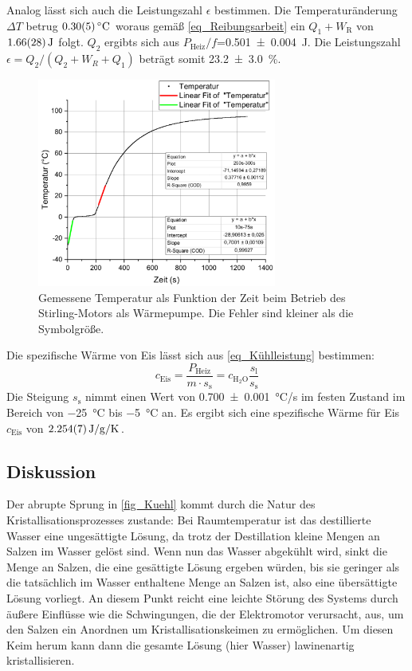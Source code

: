 \documentclass[
	a4paper,
	12pt,
	pagesize,
	ngerman
]{scrartcl}
\begin{document}
	Analog lässt sich auch die Leistungszahl $\epsilon$ bestimmen. 
	Die Temperaturänderung $\Delta{T}$ betrug $\SI{0,3+-0,05}{\degreeCelsius}$ woraus gemäß \cref{eq_Reibungsarbeit} ein $Q_1+W_\text{R}$ von $\SI{1,66+-0,28}{J}$ folgt. 
	$Q_2$ ergibts sich aus $P_\text{Heiz}/f$=\SI{0,501+-0,004}{J}.
	Die Leistungszahl $\epsilon=Q_2/(Q_2+W_R+Q_1)$ beträgt somit \SI{23,2+-3,0}{\%}.
	\begin{figure}[H]
		\includegraphics[width=0.7\textwidth]{Waerm}
		\centering
		\caption{Gemessene Temperatur als Funktion der Zeit beim Betrieb des Stirling-Motors als Wärmepumpe. Die Fehler sind kleiner als die Symbolgröße.}
		\label{fig_Waerm}
		\centering
	\end{figure}

	Die spezifische Wärme von Eis lässt sich aus \cref{eq_Kühlleistung} bestimmen:
	\begin{equation}
		c_\text{Eis} = \frac{P_\text{Heiz}}{m \cdot s_\text{s}} = c_{\text{H}_2\text{O}} \frac{s_\text{l}}{s_\text{s}}
	\end{equation} 
	Die Steigung $s_\text{s}$ nimmt einen Wert von \SI{0,700+-0,001}{\degreeCelsius/s} im festen Zustand im Bereich von \SI{-25}{\degreeCelsius} bis \SI{-5}{\degreeCelsius} an.
	Es ergibt sich eine spezifische Wärme für Eis $c_\text{Eis}$ von $\SI{2,254+-0,007}{J/g/K}$.
	\subsection{Diskussion}
	
	Der abrupte Sprung in \cref{fig_Kuehl} kommt durch die Natur des Kristallisationsprozesses zustande:
	Bei Raumtemperatur ist das destillierte Wasser eine ungesättigte Lösung, da trotz der Destillation kleine Mengen an Salzen im Wasser gelöst sind.
	Wenn nun das Wasser abgekühlt wird, sinkt die Menge an Salzen, die eine gesättigte Lösung ergeben würden, bis sie geringer als die tatsächlich im Wasser enthaltene Menge an Salzen ist, also eine übersättigte Lösung vorliegt.
	An diesem Punkt reicht eine leichte Störung des Systems durch äußere Einflüsse wie die Schwingungen, die der Elektromotor verursacht, aus, um den Salzen ein Anordnen um Kristallisationskeimen zu ermöglichen.
	Um diesen Keim herum kann dann die gesamte Lösung (hier Wasser) lawinenartig kristallisieren.
	
\end{document}
